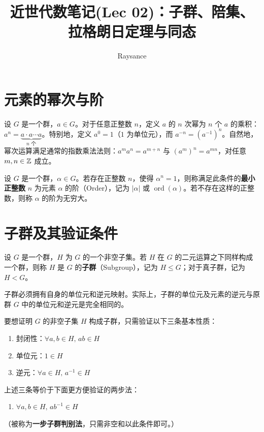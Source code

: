 \documentclass[11pt]{article}
\title{近世代数笔记(Lec 02)：子群、陪集、拉格朗日定理与同态}
\author{Raysance}
\date{}
\begin{document}
\maketitle

\section{元素的幂次与阶}

\begin{cndefinition}[群中元素的幂次运算]
    设 $G$ 是一个群，$a \in G$。对于任意正整数 $n$，定义 $a$ 的 $n$ 次幂为 $n$ 个 $a$ 的乘积：$a^n = \underbrace{a \cdot a \cdots a}_{n \text{ 个}}$。特别地，定义 $a^0 = 1$（$1$ 为单位元），而 $a^{-n} = (a^{-1})^n$。自然地，幂次运算满足通常的指数乘法法则：$a^m a^n = a^{m+n}$ 与 $(a^m)^n = a^{mn}$，对任意 $m, n \in \mathbb{Z}$ 成立。
\end{cndefinition}

\begin{cndefinition}[元素的阶]
    设 $G$ 是一个群，$\alpha \in G$。若存在正整数 $n$，使得 $\alpha^n = 1$，则称满足此条件的\textbf{最小正整数} $n$ 为元素 $\alpha$ 的阶（Order），记为 $|\alpha|$ 或 $\operatorname{ord}(\alpha)$。若不存在这样的正整数，则称 $\alpha$ 的阶为无穷大。
\end{cndefinition}

\section{子群及其验证条件}

\begin{cndefinition}[子群]
    设 $G$ 是一个群，$H$ 为 $G$ 的一个非空子集。若 $H$ 在 $G$ 的二元运算之下同样构成一个群，则称 $H$ 是 $G$ 的\textbf{子群}（Subgroup），记为 $H \le G$；对于真子群，记为 $H < G$。
\end{cndefinition}

子群必须拥有自身的单位元和逆元映射。实际上，子群的单位元及元素的逆元与原群 $G$ 中的单位元和逆元是完全相同的。

\begin{cntheorem}[子群的等价验证条件]
    要想证明 $G$ 的非空子集 $H$ 构成子群，只需验证以下三条基本性质：
    \begin{enumerate}
        \item 封闭性：$\forall a, b \in H, \, ab \in H$
        \item 单位元：$1 \in H$
        \item 逆元：$\forall a \in H, \, a^{-1} \in H$
    \end{enumerate}
    上述三条等价于下面更方便验证的两步法：
    \begin{enumerate}
        \item $\forall a, b \in H, \, ab^{-1} \in H$ 
    \end{enumerate}
    （被称为\textbf{一步子群判别法}，只需非空和以此条件即可。）
\end{cntheorem}
\end{document}
